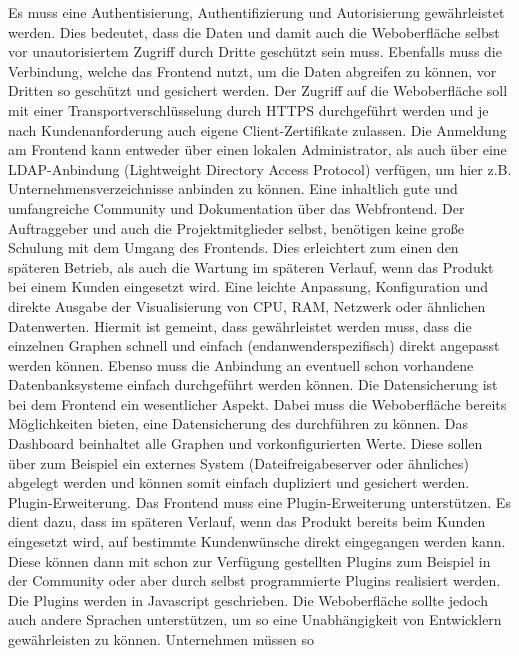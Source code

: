 \begin{outline}
  \1 Es muss eine Authentisierung, Authentifizierung und Autorisierung
  gewährleistet werden. Dies bedeutet, dass die Daten und damit auch die
  Weboberfläche selbst vor unautorisiertem Zugriff durch Dritte geschützt sein
  muss. Ebenfalls muss die Verbindung, welche das Frontend nutzt, um die Daten
  abgreifen zu können, vor Dritten so geschützt und gesichert werden. Der
  Zugriff auf die Weboberfläche soll mit einer Transportverschlüsselung durch
  \gls{HTTPS} durchgeführt werden und je nach Kundenanforderung auch eigene
  Client-Zertifikate zulassen. Die Anmeldung am Frontend kann entweder über
  einen lokalen Administrator, als auch über eine LDAP-Anbindung (Lightweight
  Directory Access Protocol) verfügen, um hier z.B. Unternehmensverzeichnisse
  anbinden zu können.
  \1 Eine inhaltlich gute und umfangreiche Community und Dokumentation über das
  Webfrontend. Der Auftraggeber und auch die Projektmitglieder selbst,
  benötigen keine große Schulung mit dem Umgang des Frontends. Dies erleichtert
  zum einen den späteren Betrieb, als auch die Wartung im späteren Verlauf,
  wenn das Produkt bei einem Kunden eingesetzt wird.
  \1 Eine leichte Anpassung, Konfiguration und direkte Ausgabe der
  Visualisierung von CPU, RAM, Netzwerk oder ähnlichen Datenwerten. Hiermit ist
  gemeint, dass gewährleistet werden muss, dass die einzelnen Graphen schnell
  und einfach (endanwenderspezifisch) direkt angepasst werden können. Ebenso
  muss die Anbindung an eventuell schon vorhandene Datenbanksysteme einfach
  durchgeführt werden können.
  \1 Die Datensicherung ist bei dem Frontend ein wesentlicher Aspekt. Dabei
  muss die Weboberfläche bereits Möglichkeiten bieten, eine Datensicherung des
   durchführen zu können. Das Dashboard
  beinhaltet alle Graphen und vorkonfigurierten Werte. Diese sollen über zum
  Beispiel ein externes System (Dateifreigabeserver oder ähnliches) abgelegt
  werden und können somit einfach dupliziert und gesichert werden.
  \1 Plugin-Erweiterung. Das Frontend muss eine Plugin-Erweiterung
  unterstützen. Es dient dazu, dass im späteren Verlauf, wenn das Produkt
  bereits beim Kunden eingesetzt wird, auf bestimmte Kundenwünsche direkt
  eingegangen werden kann. Diese können dann mit schon zur Verfügung gestellten
  Plugins zum Beispiel in der Community oder aber durch selbst programmierte
  Plugins realisiert werden. Die Plugins werden in Javascript geschrieben. Die
  Weboberfläche sollte jedoch auch andere Sprachen unterstützen, um so eine
  Unabhängigkeit von Entwicklern gewährleisten zu können. Unternehmen müssen so

\end{outline}
